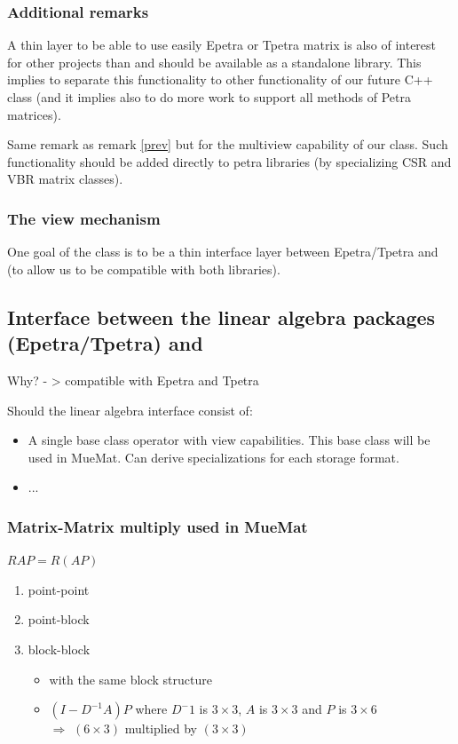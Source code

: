 \subsubsection{Additional remarks}

\begin{remark}
\label{prev}
A thin layer to be able to use easily Epetra or Tpetra matrix is also of interest for other projects than \mloo and should be available as a standalone library.
This implies to separate this functionality to other functionality of our future C++ \Operator class (and it implies
also to do more work to support all methods of Petra matrices).
\end{remark}

\begin{remark}
Same remark as remark \ref{prev} but for the multiview capability of our \Operator class. Such functionality should be added directly to petra libraries (by specializing CSR and VBR matrix classes).
\end{remark}

\subsubsection{The view mechanism}

One goal of the \Operator class is to be a thin interface layer between Epetra/Tpetra and \mloo (to allow us to be compatible with both libraries).


\subsection{Interface between the linear algebra packages (Epetra/Tpetra) and \mulu}

Why? - > compatible with Epetra and Tpetra

Should the linear algebra interface consist of:
\begin{itemize}
\item A single base class operator with view capabilities. This base class will be used in MueMat. Can derive specializations for each storage format.
\item ...
\end{itemize}

\subsubsection{Matrix-Matrix multiply used in MueMat}

$R A P = R (A P)$
\begin{enumerate}
\item point-point
\item point-block
\item block-block
\begin{itemize}
\item with the same block structure
\item $(I - D^{-1} A) P$ where $D^-1$ is $3\times3$, $A$ is $3\times3$ and $P$ is $3\times6$\\$\Rightarrow$ $(6\times3)$ multiplied by $(3\times3)$
\end{itemize}
\end{enumerate}

